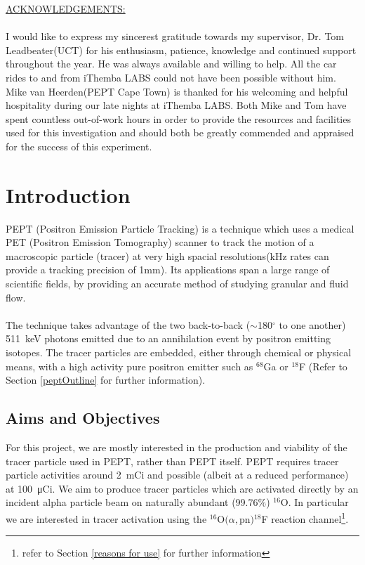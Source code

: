 \documentclass[]{article}
\begin{document}
\clearpage

\tableofcontents

\vfill
\underline{ACKNOWLEDGEMENTS:}\\\\
I would like to express my sincerest gratitude towards my supervisor, Dr. Tom Leadbeater(UCT) for his enthusiasm, patience, knowledge and continued support throughout the year. He was always available and willing to help. All the car rides to and from iThemba LABS could not have been possible without him. Mike van Heerden(PEPT Cape Town) is thanked for his welcoming and helpful hospitality during our late nights at iThemba LABS. Both Mike and Tom have spent countless out-of-work hours in order to provide the resources and facilities used for this investigation and should both be greatly commended and appraised for the success of this experiment.
\clearpage

\section{Introduction}
PEPT (Positron Emission Particle Tracking) is a technique which uses a medical PET (Positron Emission Tomography) scanner to track the motion of a macroscopic particle (tracer) at very high spacial resolutions(kHz rates can provide a tracking precision of 1mm). Its applications span a large range of scientific fields, by providing an accurate method of studying granular and fluid flow. \\\\The technique takes advantage of the two back-to-back ($\sim$180${}^{\circ}$ to one another) \SI{511}{\kilo \electronvolt} photons emitted due to an annihilation event by positron emitting isotopes. The tracer particles are embedded, either through chemical or physical means, with a high activity pure positron emitter such as ${}^{68}$Ga or ${}^{18}$F (Refer to Section \ref{peptOutline} for further information).

\subsection{Aims and Objectives}
For this project, we are mostly interested in the production and viability of the tracer particle used in PEPT, rather than PEPT itself. PEPT requires tracer particle activities around \SI{2}{\milli Ci} and possible (albeit at a reduced performance) at \SI{100}{\micro Ci}. We aim to produce tracer particles which are activated directly by an incident alpha particle beam on naturally abundant (99.76$\%$) ${}^{16}$O. In particular we are interested in tracer activation using the ${}^{16}$O$(\alpha,$pn$){}^{18}$F reaction channel\footnote{refer to Section \ref{reasons for use} for further information}. 
\end{document}
